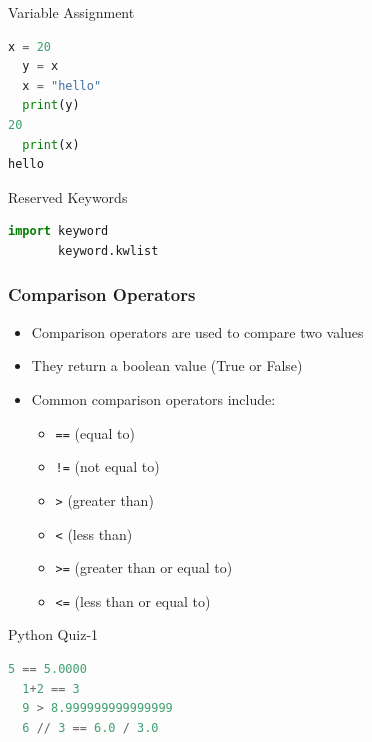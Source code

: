\begin{frame}[fragile]{Variable Assignment}
    \begin{lstlisting}[language=Python]
  x = 20
  y = x
  x = "hello"
  print(y)
20
  print(x)
hello
    \end{lstlisting}
\end{frame}

\begin{frame}[fragile]{Reserved Keywords}
    \begin{lstlisting}[language=Python]
       import keyword
       keyword.kwlist      
    \end{lstlisting}
\end{frame} 

\begin{frame}
    \frametitle{Comparison Operators}
    \begin{itemize}
        \item Comparison operators are used to compare two values
        \item They return a boolean value (True or False)
        \item Common comparison operators include:
        \begin{itemize}
            \item \texttt{==} (equal to)
            \item \texttt{!=} (not equal to)
            \item \texttt{>} (greater than)
            \item \texttt{<} (less than)
            \item \texttt{>=} (greater than or equal to)
            \item \texttt{<=} (less than or equal to)
        \end{itemize}
    \end{itemize}
\end{frame}


\begin{frame}[fragile]{Python Quiz-1}
 \begin{lstlisting}[language=Python]
  5 == 5.0000
  1+2 == 3 
  9 > 8.999999999999999
  6 // 3 == 6.0 / 3.0
\end{lstlisting}
\end{frame}

